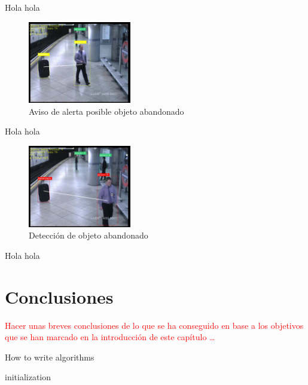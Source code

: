 Hola hola

\begin{figure}[ht]
\centering
\includegraphics[width=0.4\textwidth]{img/chapters/desarrollo/warning-abandono.jpg}
\caption{\label{fig:warning-abandono}Aviso de alerta posible objeto abandonado}
\end{figure}

Hola hola

\begin{figure}[ht]
\centering
\includegraphics[width=0.4\textwidth]{img/chapters/desarrollo/abandono-objeto-avss.jpg}
\caption{\label{fig:abandono-objeto-avss}Detección de objeto abandonado}
\end{figure}

Hola hola

\newpage

\section{Conclusiones}
\label{sec:conclu-desarrollo}

\textcolor{red}{Hacer unas breves conclusiones de lo que se ha conseguido en base a los objetivos que se han marcado en la introducción de este capítulo \ldots}

\begin{algorithm}[H]
 \caption{How to write algorithms}
 \label{alg:howto}
 initialization\;
\end{algorithm}
